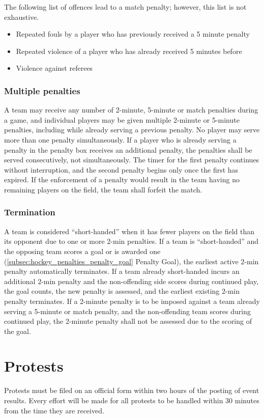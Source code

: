 The following list of offences lead to a match penalty; however, this list is not exhaustive.
\begin{itemize}
\item Repeated fouls by a player who has previously received a 5 minute penalty
\item Repeated violence of a player who has already received 5 minutes before
\item Violence against referees
\end{itemize}

\subsubsection{Multiple penalties}\label{subsubsec:hockey_penalties_multiple_penalties}
A team may receive any number of 2-minute, 5-minute or match penalties during a game, and individual players may be given multiple 2-minute or 5-minute penalties, including while already serving a previous penalty.
No player may serve more than one penalty simultaneously.
If a player who is already serving a penalty in the penalty box receives an additional penalty, the penalties shall be served consecutively, not simultaneously.
The timer for the first penalty continues without interruption, and the second penalty begins only once the first has expired.
If the enforcement of a penalty would result in the team having no remaining players on the field, the team shall forfeit the match.

\subsubsection{Termination}
A team is considered ``short-handed'' when it has fewer players on the field than its opponent due to one or more 2-min penalties.
If a team is ``short-handed'' and the opposing team scores a goal or is awarded one (\ref{subsec:hockey_penalties_penalty_goal} Penalty Goal), the earliest active 2-min penalty automatically terminates.
If a team already short-handed incurs an additional 2-min penalty and the non-offending side scores during continued play, the goal counts, the new penalty is assessed, and the earliest existing 2-min penalty terminates.
If a 2-minute penalty is to be imposed against a team already serving a 5-minute or match penalty, and the non-offending team scores during continued play, the 2-minute penalty shall not be assessed due to the scoring of the goal.

\section{Protests}
Protests must be filed on an official form within two hours of the posting of event results.
Every effort will be made for all protests to be handled within 30 minutes from the time they are received.
